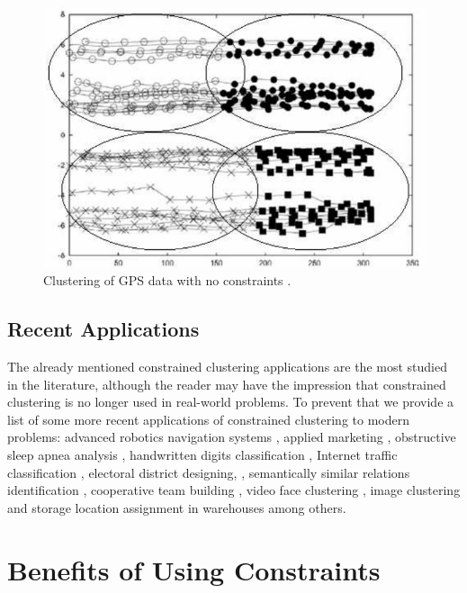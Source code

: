 \begin{figure}[!h]
	\centering
	\includegraphics[scale=0.32]{gfx/ConstClust/GPS/Instancias} 
	\caption[Clustering of GPS data with no constraints.]{Clustering of \acs{GPS} data with no constraints \cite{davidson2007survey,wagstaff2001constrained}.}\label{fig:figure15}
\end{figure}

\subsection{Recent Applications}

The already mentioned constrained clustering applications are the most studied in the literature, although the reader may have the impression that constrained clustering is no longer used in real-world problems. To prevent that we provide a list of some more recent applications of constrained clustering to modern problems: advanced robotics navigation systems \cite{semnani2016constrained}, applied marketing \cite{seret2014new}, obstructive sleep apnea analysis \cite{mai2018evolutionary}, handwritten digits classification \cite{li2015scalable}, Internet traffic classification \cite{wang2014internet}, electoral district designing, \cite{brieden2017constrained}, semantically similar relations identification \cite{wang2015constrained}, cooperative team building \cite{yang2014team}, video face clustering \cite{zhou2014video}, image clustering \cite{habashi2017semi} and storage location assignment in warehouses \cite{yang2016constrained} among others.

\section{Benefits of Using Constraints} \label{sec:ConstraintsBenefits}

